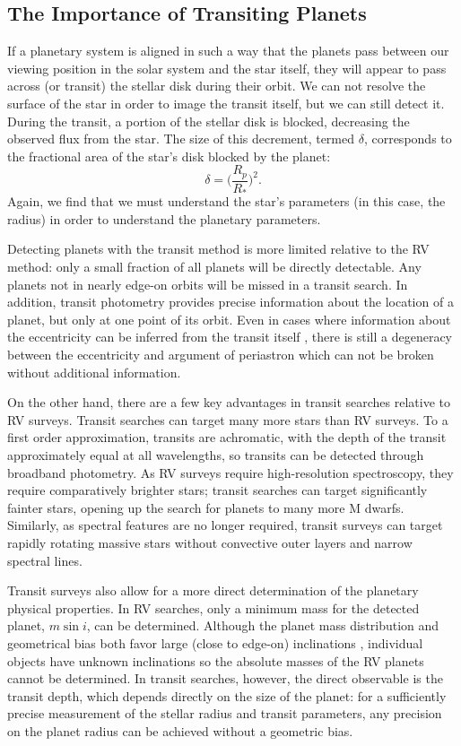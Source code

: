 \documentclass[12pt]{caltech_thesis}
\begin{document}
\subsection{The Importance of Transiting Planets}
If a planetary system is aligned in such a way that the planets pass between our
viewing position in the solar system and the star itself, they will appear to pass
across (or transit) the stellar disk during their orbit.
We can not resolve the surface of the star in order to image the transit itself, but
we can still detect it. 
During the transit, a portion of the stellar disk is blocked, decreasing the observed
flux from the star. 
The size of this decrement, termed $\delta$, corresponds to the fractional area of the star's disk blocked by the planet:
\begin{equation}
\delta = \bigg(\frac{R_p}{R_*}\bigg)^2.
\end{equation}
Again, we find that we must understand the star's parameters (in this case, the radius)
in order to understand the planetary parameters.

Detecting planets with the transit method is more limited relative to the RV method:
only a small fraction of all planets will be directly detectable. 
Any planets not in nearly edge-on orbits will be missed in a transit search.
In addition, transit photometry provides precise information about the location 
of a planet, but only at one point of its orbit.
Even in cases where information about the eccentricity can be inferred from the
transit itself \citep{Dawson12a}, there is still a degeneracy
between the eccentricity and argument of periastron which can not be broken without
additional information.

On the other hand, there are a few key advantages in transit searches relative to 
RV surveys. 
Transit searches can target many more stars than RV surveys. 
To a first order approximation, transits are achromatic, with the depth of the transit
approximately equal at all wavelengths, so transits can be detected through broadband
photometry.
As RV surveys require high-resolution spectroscopy, they require comparatively brighter
stars; transit searches can target significantly fainter stars, opening up the search
for planets to many more M dwarfs.
Similarly, as spectral features are no longer required, transit surveys can target 
rapidly rotating massive stars without convective outer layers and narrow spectral lines.

Transit surveys also allow for a more direct determination of the planetary physical 
properties. 
In RV searches, only a minimum mass
for the detected planet, $m \sin i$, can be determined. 
Although the planet mass distribution and geometrical bias both favor large
(close to edge-on) inclinations \citep{Ho11}, individual objects have unknown inclinations
so the absolute masses of the RV planets cannot be determined.
In transit searches, however, the direct observable is the transit depth, which depends
directly on the size of the planet: for a sufficiently precise measurement of the stellar
radius and transit parameters, any precision on the planet radius can be achieved without
a geometric bias.
\end{document}
